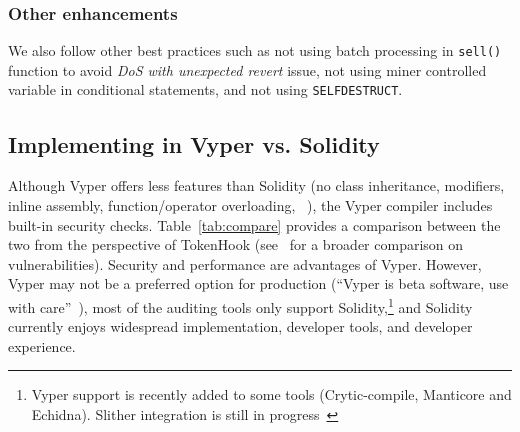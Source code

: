\subsubsection{Other enhancements} We also follow other best practices such as not using batch processing in \texttt{sell()} function to avoid \textit{DoS with unexpected revert} issue, not using miner controlled variable in conditional statements, and not using \texttt{SELFDESTRUCT}.

\subsection{Implementing in Vyper vs. Solidity}
Although Vyper offers less features than Solidity (\eg no class inheritance, modifiers, inline assembly, function/operator overloading, \etc~\cite{SolidityDoc}), the Vyper compiler includes built-in security checks. Table~\ref{tab:compare} provides a comparison between the two from the perspective of TokenHook (see~\cite{Vyper1} for a broader comparison on vulnerabilities). Security and performance are advantages of Vyper. However, Vyper may not be a preferred option for production (``Vyper is beta software, use with care''~\cite{VyperReadme}), most of the auditing tools only support Solidity,\footnote{Vyper support is recently added to some tools (\eg Crytic-compile, Manticore and Echidna). Slither integration is still in progress~\cite{Crytic}} and Solidity currently enjoys widespread implementation, developer tools, and developer experience.


